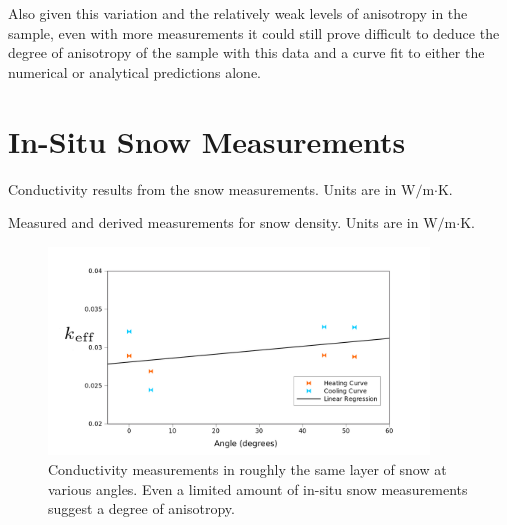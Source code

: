 Also given this variation and the relatively weak levels of anisotropy in the
sample, even with more measurements it could still prove difficult to deduce
the degree of anisotropy of the sample with this data and a curve fit to either
the numerical or analytical predictions alone.

\section{In-Situ Snow Measurements}

\begin{table}[h]
\centering

\caption{Conductivity results from the snow measurements. Units are in W\(/\)m\(\cdot\)K.}
\label{tab:snow}
\end{table}

\begin{table}[h]
\centering

\caption{Measured and derived measurements for snow density. Units are in W\(/\)m\(\cdot\)K.}
\label{tab:density}
\end{table}

\begin{figure}[h]
\centering
\includegraphics[width=0.9\textwidth]{fig/snow_meas.png}
\caption{Conductivity measurements in roughly the same layer of snow at various 
angles. Even a limited amount of in-situ snow measurements suggest a degree of
anisotropy.}
\label{fig:snow_results}
\end{figure}

